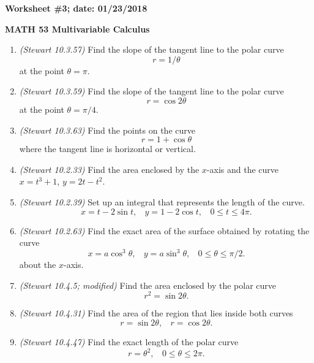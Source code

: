 \documentclass{article}
\begin{document}
{\bf Worksheet \#3; date: 01/23/2018}

{\bf MATH 53 Multivariable Calculus}

\begin{enumerate}
\item {\em (Stewart 10.3.57)} Find the slope of the tangent line to the polar curve
\[
r = 1/\theta
\]
at the point $\theta = \pi$.

\item {\em (Stewart 10.3.59)} Find the slope of the tangent line to the polar curve
\[
r = \cos 2\theta
\]
at the point $\theta = \pi/4$.

\item {\em (Stewart 10.3.63)} Find the points on the curve
\[
r = 1 + \cos\theta
\]
where the tangent line is horizontal or vertical.

\item {\em (Stewart 10.2.33)} Find the area enclosed by the $x$-axis and the curve $x = t^3 + 1$, $y = 2t - t^2$.

\item {\em (Stewart 10.2.39)} Set up an integral that represents the length of the curve.
\[
x = t - 2 \sin t, ~~~~ y = 1 - 2 \cos t, ~~~~ 0 \le t \le 4\pi.
\]

\item {\em (Stewart 10.2.63)} Find the exact area of the surface obtained by rotating the curve
\[
x = a \cos^3 \theta, ~~~~ y = a \sin^3 \theta, ~~~~ 0 \le \theta \le \pi/2.
\]
about the $x$-axis.

\item {\em (Stewart 10.4.5; modified)} Find the area enclosed by the polar curve
\[
r^2 = \sin 2\theta.
\]

\item {\em (Stewart 10.4.31)} Find the area of the region that lies inside both curves
\[
r = \sin 2\theta, ~~~~ r = \cos 2\theta.
\]

\item {\em (Stewart 10.4.47)} Find the exact length of the polar curve
\[
r = \theta^2, ~~~~ 0 \le \theta \le 2\pi.
\]
\end{enumerate}
\end{document}
